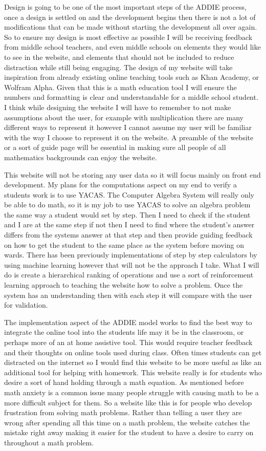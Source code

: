 \documentclass[10pt,twocolumn]{article}
\begin{document}
Design is going to be one of the most important steps of the ADDIE process, once a design is settled on and the development begins then there is not a lot of modifications that can be made without starting the development all over again. So to ensure my design is most effective as possible I will be receiving feedback from middle school teachers, and even middle schools on elements they would like to see in the website, and elements that should not be included to reduce distraction while still being engaging. The design of my website will take inspiration from already existing online teaching tools such as Khan Academy, or Wolfram Alpha. Given that this is a math education tool I will ensure the numbers and formatting is clear and understandable for a middle school student. I think while designing the website I will have to remember to not make assumptions about the user, for example with multiplication there are many different ways to represent it however I cannot assume my user will be familiar with the way I choose to represent it on the website. A preamble of the website or a sort of guide page will be essential in making sure all people of all mathematics backgrounds can enjoy the website. 

This website will not be storing any user data so it will focus mainly on front end development. My plans for the computations aspect on my end to verify a students work is to use YACAS. The Computer Algebra System will really only be able to do math, so it is my job to use YACAS to solve an algebra problem the same way a student would set by step. Then I need to check if the student and I are at the same step if not then I need to find where the student's answer differs from the systems answer at that step and then provide guiding feedback on how to get the student to the same place as the system before moving on wards. There has been previously implementations of step by step calculators by using machine learning however that will not be the approach I take. What I will do is create a hierarchical ranking of operations and use a sort of reinforcement learning approach to teaching the website how to solve a problem. Once the system has an understanding then with each step it will compare with the user for validation. 

The implementation aspect of the ADDIE model works to find the best way to integrate the online tool into the students life may it be in the classroom, or perhaps more of an at home assistive tool. This would require teacher feedback and their thoughts on online tools used during class. Often times students can get distracted on the internet so I would find this website to be more useful as like an additional tool for helping with homework. This website really is for students who desire a sort of hand holding through a math equation. As mentioned before math anxiety is a common issue many people struggle with causing math to be a more difficult subject for them. So a website like this is for people who develop frustration from solving math problems. Rather than telling a user they are wrong after spending all this time on a math problem, the website catches the mistake right away making it easier for the student to have a desire to carry on throughout a math problem. 
\end{document}
